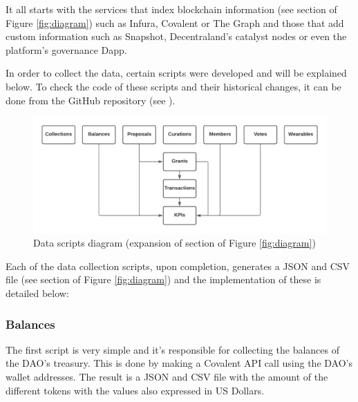\documentclass[MSE,Master,english]{twbook}%
\newcommand{\rom}[1]{\uppercase\expandafter{\romannumeral #1\relax}}
\begin{document}
It all starts with the services that index blockchain information (see section \rom{1} of Figure \ref{fig:diagram}) such as Infura, Covalent or The Graph and those that add custom information such as Snapshot, Decentraland's catalyst nodes or even the platform's governance Dapp.

In order to collect the data, certain scripts were developed and will be explained below. To check the code of these scripts and their historical changes, it can be done from the GitHub repository (see \cite{transparencyRepo}). \\

\begin{figure}[H]
  \centering
  \includegraphics[width=\textwidth]{scripts_diagram.png}
  \caption{Data scripts diagram (expansion of section \rom{2} of Figure \ref{fig:diagram})}
  \label{fig:scripts_diagram}
\end{figure}

Each of the data collection scripts, upon completion, generates a JSON and CSV file (see section \rom{3} of Figure \ref{fig:diagram}) and the implementation of these is detailed below:
\subsubsection{Balances}
The first script is very simple and it's responsible for collecting the balances of the DAO's treasury. This is done by making a Covalent API call using the DAO's wallet addresses. The result is a JSON and CSV file with the amount of the different tokens with the values also expressed in US Dollars. \\
\end{document}
